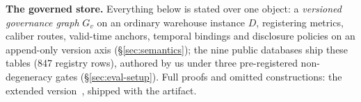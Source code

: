\label{mk:theorystart}%
\smallskip\noindent{}\textbf{The governed store.} Everything below is stated over
one object: a \emph{versioned governance graph} $G_v$ on an ordinary warehouse
instance $D$, registering metrics, caliber routes, valid-time anchors,
temporal bindings and disclosure policies on an append-only version axis
(\S\ref{sec:semantics}); the nine public databases ship these
tables (847 registry rows), authored by us under three pre-registered
non-degeneracy gates (\S\ref{sec:eval-setup}). Full proofs and omitted
constructions: the extended version~\cite{asofgov-tr}, shipped with the
artifact.
